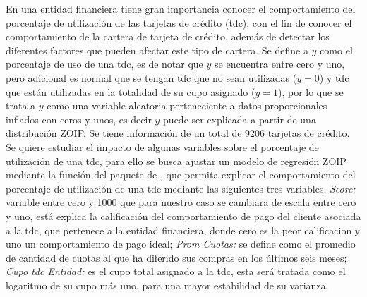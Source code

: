 En una entidad financiera tiene gran importancia conocer el comportamiento del porcentaje de utilizaci\'{o}n de las tarjetas de cr\'{e}dito (tdc), con el fin de conocer el comportamiento de la cartera de tarjeta de cr\'{e}dito, adem\'{a}s de detectar los diferentes factores que pueden afectar este tipo de cartera. Se define a $y$ como el porcentaje de uso de una tdc, es de notar que $y$ se encuentra entre cero y uno, pero adicional es normal que se tengan tdc que no sean utilizadas ($y=0$) y tdc que est\'{a}n utilizadas en la totalidad de su cupo asignado ($y=1$), por lo que se trata a $y$ como una variable aleatoria perteneciente a datos proporcionales inflados con ceros y unos, es decir $y$ puede ser explicada a partir de una distribuci\'{o}n ZOIP. Se tiene informaci\'{o}n de un total de 9206 tarjetas de cr\'{e}dito. Se quiere estudiar el impacto de algunas variables sobre el porcentaje de utilizaci\'{o}n de una tdc, para ello se busca ajustar un modelo de regresi\'{o}n ZOIP mediante la funci\'{o}n  del paquete  de , que permita explicar el comportamiento del porcentaje de utilizaci\'{o}n de una tdc mediante las siguientes tres variables, \textsl{Score:} variable entre cero y 1000 que para nuestro caso se cambiara de escala entre cero y uno, est\'{a} explica la calificaci\'{o}n del comportamiento de pago del cliente asociada a la tdc, que pertenece a la entidad financiera, donde cero es la peor calificacion y uno un comportamiento de pago ideal; \textsl{Prom Cuotas:} se define como el promedio de cantidad de cuotas al que ha diferido sus compras en los \'{u}ltimos seis meses; \textsl{Cupo tdc Entidad:} es el cupo total asignado a la tdc, esta ser\'{a} tratada como el logaritmo de su cupo m\'{a}s uno, para una mayor estabilidad de su varianza.\\

